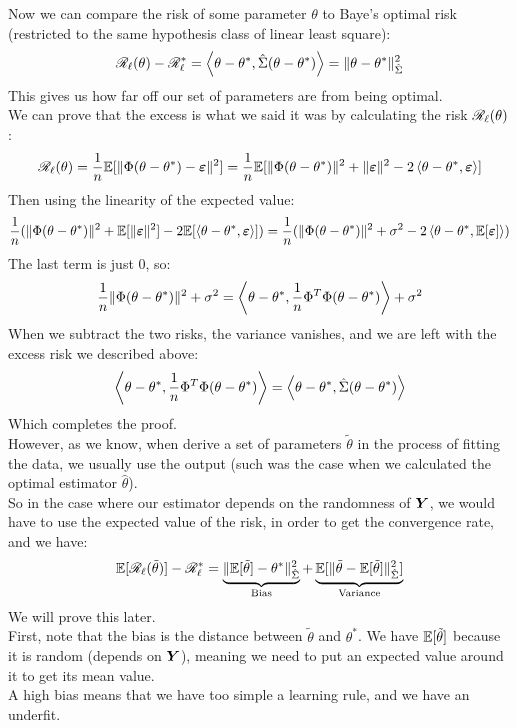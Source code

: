 \documentclass[12pt]{article}
\begin{document}
Now we can compare
the risk of some parameter $\theta$
to Baye's optimal risk (restricted
to the same hypothesis class of
linear least square):
\[ \mathscr{R}_{\ell}(\theta) - \mathscr{R}_{\ell}^*
= \left\langle \theta - \theta^*, 
\hat{\Sigma}(\theta - \theta^*)  \right\rangle
= \|\theta - \theta^* \|_{\hat{\Sigma}}^2 \]
This gives us how far off our set
of parameters are from being optimal. \\

We can prove that the excess is
what we said it was by calculating
the risk $\mathscr{R}_{\ell}(\theta)$:
\[ \mathscr{R}_{\ell}(\theta) =
\dfrac{1}{n}\mathbb{E}[\|\Phi (\theta - \theta^*) 
- \boldsymbol{\varepsilon} \|^2]
= \dfrac{1}{n}\mathbb{E}[\|\Phi (\theta - \theta^*) \|^2
+ \|\boldsymbol{\varepsilon} \|^2 
- 2\left\langle \theta - \theta^*, \boldsymbol{\varepsilon} \right\rangle] \]
Then using the linearity of the expected value:
\[ \dfrac{1}{n} (\|\Phi (\theta - \theta^*) \|^2
+ \mathbb{E}[\|\boldsymbol{\varepsilon} \|^2 ]
- 2\mathbb{E}[\left\langle \theta - \theta^*, \boldsymbol{\varepsilon} \right\rangle])
= \dfrac{1}{n} (\|\Phi (\theta - \theta^*) \|^2
+ \sigma^2 - 
2\left\langle \theta - \theta^*, \mathbb{E}[\boldsymbol{\varepsilon}] \right\rangle) \]
The last term is just $0$, so:
\[ \dfrac{1}{n} \|\Phi (\theta - \theta^*) \|^2
+ \sigma^2
= \left\langle \theta - \theta^*,
\dfrac{1}{n}\Phi^T\Phi(\theta - \theta^*) \right\rangle
+ \sigma^2 \]
When we subtract the two risks,
the variance vanishes, and we are left
with the excess risk we described above:
\[ \left\langle \theta - \theta^*,
\dfrac{1}{n}\Phi^T\Phi(\theta - \theta^*) \right\rangle
= \left\langle \theta - \theta^*,
\hat{\Sigma}(\theta - \theta^*) \right\rangle \]
Which completes the proof. \\

However, as we know, when derive a set
of parameters $\tilde{\theta}$ in the process
of fitting the data, we usually use the output
(such was the case when we calculated the
optimal estimator $\hat{\theta}$). \\
So in the case where our estimator depends
on the randomness of $\boldsymbol{Y}$,
we would have to use the expected value
of the risk, in order to get the convergence
rate, and we have:
\[ \mathbb{E}[\mathscr{R}_{\ell}(\tilde{\theta})] 
- \mathscr{R}_{\ell}^* = \underbrace{
\| \mathbb{E}[\tilde{\theta}] - \theta^*
\|^2_{\hat{\Sigma}}}_{\text{Bias}}
+ \underbrace{
\mathbb{E}[\|\tilde{\theta} - \mathbb{E}[\tilde{\theta}] 
\|^2_{\hat{\Sigma}}]}_{\text{Variance}} \]
We will prove this later. \\

First, note that the bias is the 
distance between $\tilde{\theta}$
and $\theta^*$.
We have $\mathbb{E}[\tilde{\theta}]$
because it is random (depends on $\boldsymbol{Y}$),
meaning we need to put an expected value
around it to get its mean value. \\
A high bias means that we have too simple a
learning rule, and we have an underfit.\\
\end{document}
